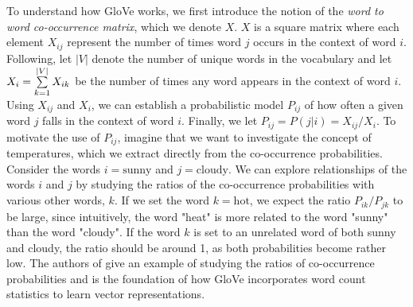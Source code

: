 To understand how GloVe works, we first introduce the notion of the \textit{word to word co-occurrence matrix}, which we denote $X$. $X$ is a square matrix where each element $X_{ij}$ represent the number of times word $j$ occurs in the context of word $i$. Following, let $|V|$ denote the number of unique words in the vocabulary and let $X_i=\sum\limits_{k=1}^{|V|} X_{ik}$ be the number of times any word appears in the context of word $i$. Using $X_{ij}$ and $X_i$, we can establish a probabilistic model $P_{ij}$ of how often a given word $j$ falls in the context of word $i$. Finally, we let $P_{ij}=P(j|i)=X_{ij} / {X_i}$. To motivate the use of $P_{ij}$, imagine that we want to investigate the concept of temperatures, which we extract directly from the co-occurrence probabilities. Consider the words $i = \text{sunny}$ and $j = \text{cloudy}$. We can explore relationships of the words $i$ and $j$ by studying the ratios of the co-occurrence probabilities with various other words, $k$. If we set the word $k = \text{hot}$, we expect the ratio $P_{ik} / P_{jk}$ to be large, since intuitively, the word "heat" is more related to the word "sunny" than the word "cloudy". If the word $k$ is set to an unrelated word of both sunny and cloudy, the ratio should be around 1, as both probabilities become rather low. The authors of \cite{pennington2014glove} give an example of studying the ratios of co-occurrence probabilities and is the foundation of how GloVe incorporates word count statistics to learn vector representations.

